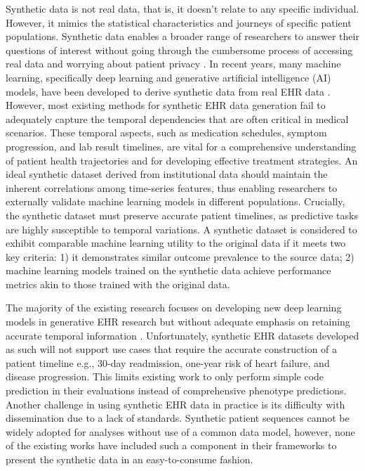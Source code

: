 \begin{multicols}{2}
Synthetic data is not real data, that is, it doesn't relate to any specific individual. However, it mimics the statistical characteristics and journeys of specific patient populations. Synthetic data enables a broader range of researchers to answer their questions of interest without going through the cumbersome process of accessing real data and worrying about patient privacy \cite{Ghosheh2022}. In recent years, many machine learning, specifically deep learning and generative artificial intelligence (AI) models, have been developed to derive synthetic data from real EHR data \cite{Choi2017}. However, most existing methods for synthetic EHR data generation fail to adequately capture the temporal dependencies that are often critical in medical scenarios. These temporal aspects, such as medication schedules, symptom progression, and lab result timelines, are vital for a comprehensive understanding of patient health trajectories and for developing effective treatment strategies. An ideal synthetic dataset derived from institutional data should maintain the inherent correlations among time-series features, thus enabling researchers to externally validate machine learning models in different populations. Crucially, the synthetic dataset must preserve accurate patient timelines, as predictive tasks are highly susceptible to temporal variations. A synthetic dataset is considered to exhibit comparable machine learning utility to the original data if it meets two key criteria: 1) it demonstrates similar outcome prevalence to the source data; 2) machine learning models trained on the synthetic data achieve performance metrics akin to those trained with the original data.

The majority of the existing research focuses on developing new deep learning models in generative EHR research but without adequate emphasis on retaining accurate temporal information \cite{Li2017, Li2023, Lee2020}. Unfortunately, synthetic EHR datasets developed as such will not support use cases that require the accurate construction of a patient timeline e.g., 30-day readmission, one-year risk of heart failure, and disease progression. This limits existing work to only perform simple code prediction in their evaluations instead of comprehensive phenotype predictions. Another challenge in using synthetic EHR data in practice is its difficulty with dissemination due to a lack of standards. Synthetic patient sequences cannot be widely adopted for analyses without use of a common data model, however, none of the existing works have included such a component in their frameworks to present the synthetic data in an easy-to-consume fashion.  


\end{multicols}
